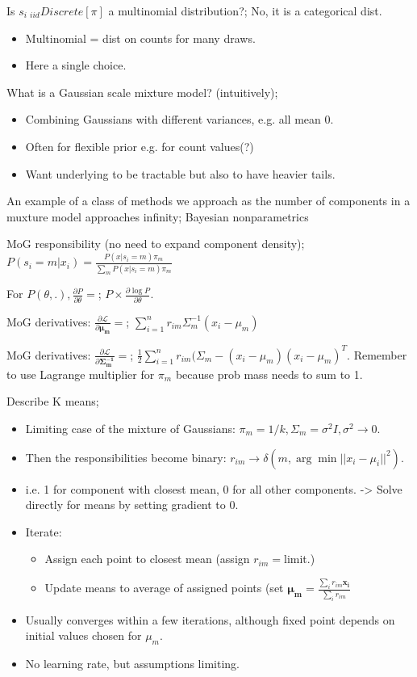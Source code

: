 \documentclass{article}
\begin{document}
Is $s_i~_{iid}Discrete[\pi]$ a multinomial distribution?; No, it is a categorical dist. \begin{itemize} \item Multinomial = dist on counts for many draws.  \item Here a single choice.  \end{itemize}

What is a Gaussian scale mixture model? (intuitively); \begin{itemize} \item Combining Gaussians with different variances, e.g. all mean 0.  \item Often for flexible prior e.g. for count values(?) \item Want underlying to be tractable but also to have heavier tails.  \end{itemize}

An example of a class of methods we approach as the number of components in a muxture model approaches infinity; Bayesian nonparametrics

MoG responsibility (no need to expand component density); $P(s_i=m|x_i) = \frac{P(x|s_i=m)\pi_m}{\sum_m P(x|s_i=m)\pi_m}$

For $P(\theta, .), \frac{\partial P}{\partial \theta} =$; $P\times \frac{\partial\log P}{\partial \theta}$.

MoG derivatives: $\frac{\partial \mathcal{L}}{\partial \mathbf{\mu_m}} =$; $\sum_{i=1}^n r_{im}\Sigma^{-1}_m(x_i-\mu_m)$

MoG derivatives: $\frac{\partial \mathcal{L}}{\partial \mathbf{\Sigma^{-1}_m}} =$; $\frac{1}{2}\sum_{i=1}^n r_{im}(\Sigma_m-(x_i-\mu_m)(x_i-\mu_m)^T$. \newline Remember to use Lagrange multiplier for $\pi_m$ because prob mass needs to sum to 1.

Describe K means; \begin{itemize} \item Limiting case of the mixture of Gaussians: $\pi_m = 1/k, \Sigma_m=\sigma^2I, \sigma^2\rightarrow 0$.  \item Then the responsibilities become binary: $r_{im}\rightarrow\delta(m, \arg\min ||x_i-\mu_i||^2)$.  \item i.e. 1 for component with closest mean, 0 for all other components. -> Solve directly for means by setting gradient to 0.  \item Iterate: \begin{itemize} \item Assign each point to closest mean (assign $r_{im}=$limit.) \item Update means to average of assigned points (set $\mathbf{\mu_m}=\frac{\sum_i r_{im}\mathbf{x_i}}{\sum_i r_{im}}$ \end{itemize} \item Usually converges within a few iterations, although fixed point depends on initial values chosen for $\mu_m$.  \item No learning rate, but assumptions limiting.  \end{itemize}
\end{document}
